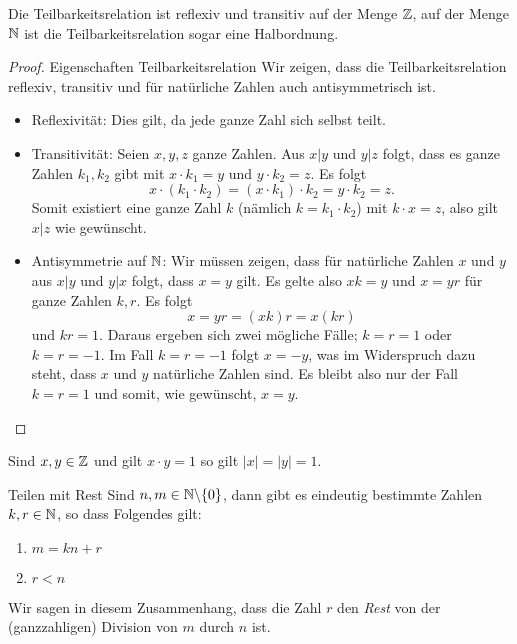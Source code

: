 \begin{remark}
    Die Teilbarkeitsrelation ist reflexiv und transitiv auf der Menge $\mathbb{Z}$, auf der Menge $\mathbb{N}$ ist die Teilbarkeitsrelation sogar eine Halbordnung.
\end{remark}

\begin{proof}{Eigenschaften Teilbarkeitsrelation}
    Wir zeigen, dass die Teilbarkeitsrelation reflexiv, transitiv und für natürliche Zahlen auch antisymmetrisch ist.
    \begin{itemize}
        \item Reflexivität: Dies gilt, da jede ganze Zahl sich selbst teilt.
        \item Transitivität: Seien $x,y,z$ ganze Zahlen. Aus $x|y$ und $y|z$ folgt, dass es ganze Zahlen $k_1,k_2$ gibt mit $x\cdot k_1=y$ und $y\cdot k_2=z$. Es folgt
            \[
                x\cdot(k_1\cdot k_2)=(x\cdot k_1)\cdot k_2=y\cdot k_2=z.
            \]
            Somit existiert eine ganze Zahl $k$ (nämlich $k=k_1\cdot k_2$) mit $k\cdot x=z$, also gilt $x|z$ wie gewünscht.\qedhere
        \item Antisymmetrie auf $\mathbb{N}$: Wir müssen zeigen, dass für natürliche Zahlen $x$ und $y$ aus $x|y$ und $y|x$ folgt, dass $x=y$ gilt. Es gelte also $xk=y$ und $x=yr$ für ganze Zahlen $k,r$. Es folgt
            \[
                x=yr=(xk)r=x(kr)
            \]
            und $kr=1$. Daraus ergeben sich zwei mögliche Fälle; $k=r=1$ oder $k=r=-1$. Im Fall $k=r=-1$ folgt $x=-y$, was im Widerspruch dazu steht, dass $x$ und $y$ natürliche Zahlen sind. Es bleibt also nur der Fall $k=r=1$ und somit, wie gewünscht, $x=y$.
    \end{itemize}
\end{proof}

\begin{remark}
    Sind $x,y\in\mathbb{Z}$ und gilt $x\cdot y=1$ so gilt $|x|=|y|=1$.
\end{remark}

\begin{lemma}{Teilen mit Rest}
    Sind $n,m\in\mathbb{N}\backslash\{0\}$, dann gibt es eindeutig bestimmte Zahlen $k,r\in\mathbb{N}$, so dass Folgendes gilt:
    \begin{enumerate}
        \item $m=kn+r$
        \item $r<n$
    \end{enumerate}
    Wir sagen in diesem Zusammenhang, dass die Zahl $r$ den \textit{Rest} von der (ganzzahligen) Division von $m$ durch $n$ ist.
\end{lemma}

